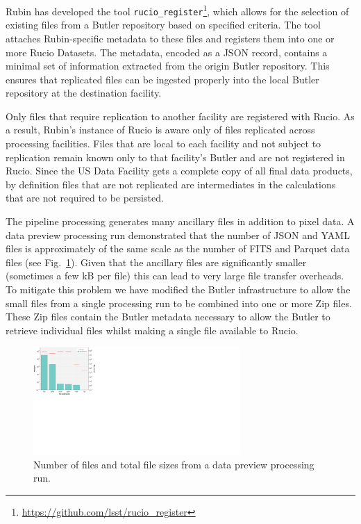\documentclass{webofc}
\begin{document}
Rubin has developed the tool \texttt{rucio\_register}\footnote{\url{https://github.com/lsst/rucio_register}}, which allows for the selection of existing files from a Butler repository based on specified criteria. The tool attaches Rubin-specific metadata to these files and registers them into one or more Rucio Datasets. The metadata, encoded as a JSON record, contains a minimal set of information extracted from the origin Butler repository. This ensures that replicated files can be ingested properly into the local Butler repository at the destination facility.

Only files that require replication to another facility are registered with Rucio. As a result, Rubin's instance of Rucio is aware only of files replicated across processing facilities. Files that are local to each facility and not subject to replication remain known only to that facility's Butler and are not registered in Rucio. Since the US Data Facility gets a complete copy of all final data products, by definition files that are not replicated are intermediates in the calculations that are not required to be persisted.

The pipeline processing generates many ancillary files in addition to pixel data.
A data preview processing run \cite{10.1051/epjconf/20242950404} demonstrated that the number of JSON and YAML files is approximately of the same scale as the number of FITS and Parquet data files (see Fig.\ \ref{fig:filecount}).
Given that the ancillary files are significantly smaller (sometimes a few kB per file) this can lead to very large file transfer overheads.
To mitigate this problem we have modified the Butler infrastructure to allow the small files from a single processing run to be combined into one or more Zip files.
These Zip files contain the Butler metadata necessary to allow the Butler to retrieve individual files whilst making a single file available to Rucio.

\begin{figure}[h]
\includegraphics[width=0.7\textwidth, center]{images/file_count_and_file_sizes.pdf}
\caption{Number of files and total file sizes from a data preview processing run.}
\label{fig:filecount}
\end{figure}
\end{document}
